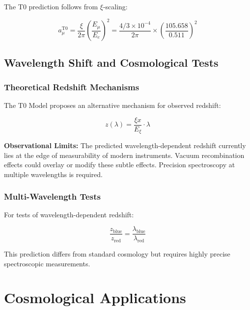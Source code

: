 \documentclass[12pt,a4paper]{report}
\newcommand{\Exi}{E_\xi}
\begin{document}
	The T0 prediction follows from $\xi$-scaling:
	
	\begin{equation}
		a_\mu^{\text{T0}} = \frac{\xi}{2\pi} \left(\frac{E_\mu}{E_e}\right)^2 = \frac{4/3 \times 10^{-4}}{2\pi} \times \left(\frac{105.658}{0.511}\right)^2
	\end{equation}
	
	\section{Wavelength Shift and Cosmological Tests}
	
	\subsection{Theoretical Redshift Mechanisms}
	
	The T0 Model proposes an alternative mechanism for observed redshift:
	
	\begin{equation}
		z(\lambda) = \frac{\xi x}{\Exi} \cdot \lambda
	\end{equation}
	
	\begin{caution}
		\textbf{Observational Limits:} The predicted wavelength-dependent redshift currently lies at the edge of measurability of modern instruments. Vacuum recombination effects could overlay or modify these subtle effects. Precision spectroscopy at multiple wavelengths is required.
	\end{caution}
	
	\subsection{Multi-Wavelength Tests}
	
	For tests of wavelength-dependent redshift:
	
	\begin{equation}
		\frac{z_{\text{blue}}}{z_{\text{red}}} = \frac{\lambda_{\text{blue}}}{\lambda_{\text{red}}}
	\end{equation}
	
	This prediction differs from standard cosmology but requires highly precise spectroscopic measurements.
	
	\chapter{Cosmological Applications}
	
\end{document}
